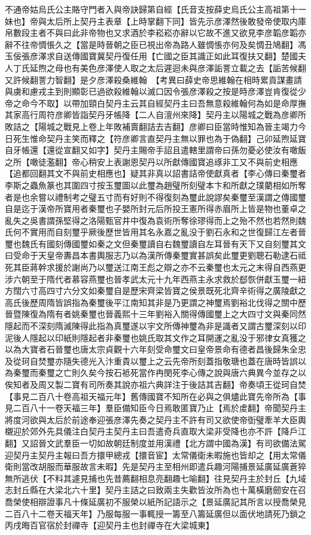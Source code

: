 不通帝姑烏氏公主賂守門者入與帝訣歸第自經【氏音支按薛史烏氏公主高祖第十一妹也】帝與太后所上契丹主表章【上時掌翻下同】皆先示彦澤然後敢發帝使取内庫帛數段主者不與曰此非帝物也又求酒於李崧崧亦辭以它故不進又欲見李彦韜彦韜亦辭不往帝惆悵久之【當是時晉朝之臣已視出帝為路人雖惆悵亦何及矣惆丑鳩翻】馮玉佞張彦澤求自送傳國寶冀契丹復任用【亡國之臣其識正如此耳復扶又翻】楚國夫人丁氏延煦之母也有美色彦澤使人取之太后遲迴未與彦澤詬詈立載之去【詬苦候翻又許候翻詈力智翻】是夕彦澤殺桑維翰　【考異曰薛史帝思維翰在相時累貢謀畫請與虜和慮戎主到則顯彰已過欲殺維翰以滅口因令張彦澤殺之按是時彦澤豈肯復從少帝之命今不取】以帶加頸白契丹主云其自經契丹主曰吾無意殺維翰何為如是命厚撫其家高行周符彦卿皆詣契丹牙帳降【二人自澶州來降】契丹主以陽城之戰為彦卿所敗詰之【陽城之戰見上卷上年敗補賣翻詰去吉翻】彦卿曰臣當時惟知為晉主竭力今日死生惟命契丹主笑而釋之【符彦卿言直契丹主無以罪也為于偽翻】己卯延煦延寶自牙帳還【還從宣翻又如字】契丹主賜帝手詔且遣轄里謂帝曰孫勿憂必使汝有噉飯之所【噉徒濫翻】帝心稍安上表謝恩契丹以所獻傳國寶追琢非工又不與前史相應【追都回翻其文不與前史相應也】疑其非真以詔書詰帝使獻真者【李心傳曰秦璽者李斯之蟲魚篆也其圍四寸按玉璽圖以此璽為趙璧所刻璧本卞和所獻之璞藺相如所奪者是也余嘗以禮制考之璧五寸而有好則不得復刻為璽此說謬矣秦璽至漢謂之傳國璽自是迄于漢帝所寶用者秦璽也子嬰所封元后所投王憲所得赤眉所上皆是物也董卓之亂失之吳書謂孫堅得之洛陽甄官井中復為袁術所奪徐璆得而上之殆不然也若然則魏氏何不實用而自刻璽乎厥後歷世皆用其名永嘉之亂没于劉石永和之世復歸江左者晉璽也魏氏有國刻傳國璽如秦之文但秦璽讀自右魏璽讀自左耳晉有天下又自刻璽其文曰受命于天皇帝夀昌本書輿服志乃以為漢所傳秦璽實甚誤矣此璽更劉聰石勒逮石祗死其臣蔣幹求援於謝尚乃以璽送江南王彪之辯之亦不云秦璽也太元之末得自西燕更涉六朝至于隋代者慕容燕璽也晉孝武太元十九年西燕主永求救於郄恢併獻玉璽一紐方闊六寸高四寸六分文如秦璽自是歷宋齊梁皆寶之侯景既死北齊辛術得之廣陵獻之高氏後歷周隋皆誤指為秦璽後平江南知其非是乃更謂之神璽焉劉裕北伐得之關中歷晉暨陳復為隋有者姚秦璽也晉義熙十三年劉裕入關得傳國璽上之大四寸文與秦同然隱起而不深刻隋滅陳得此指為真璽遂以宇文所傳神璽為非是識者又謂古璽深刻以印泥後人隱起以印紙則隱起者非秦璽也姚氏取其文作之耳開運之亂没于邪律女真獲之以為大寶者石晉璽也唐太宗貞觀十六年刻受命璽文曰皇帝景命有德者昌後歸朱全忠及從珂自焚璽亦隨失德光入汴重貴以璽上之云先帝所刻蓋指敬瑭也蓋在唐時皆誤以為秦璽而秦璽之亡則久矣今按石袛死當作冉閔死李心傳之說與唐六典異今並存之以俟知者及周又製二寶有司所奏其說亦祖六典詳注于後詰其吉翻】帝奏頃王從珂自焚【事見二百八十卷高祖天福元年】舊傳國寶不知所在必與之俱燼此寶先帝所為【事見二百八十一卷天福三年】羣臣備知臣今日焉敢匿寶乃止【焉於䖍翻】帝聞契丹主將度河欲與太后於前途奉迎張彦澤先奏之契丹主不許有司又欲使帝衘璧牽羊大臣輿櫬迎於郊外先具儀注白契丹主契丹主曰吾遣奇兵直取大梁非受降也亦不許【降戶江翻】又詔晉文武羣臣一切如故朝廷制度並用漢禮【北方謂中國為漢】有司欲備法駕迎契丹主契丹主報曰吾方擐甲總戎【擐音宦】太常儀衛未暇施也皆却之【用太常儀衛則當改胡服而華服故言未暇】先是契丹主至相州即遣兵趣河陽捕景延廣延廣蒼猝無所逃伏【不料其遽見捕也先昔薦翻相息亮翻趣七喻翻】往見契丹主於封丘【九域志封丘縣在大梁北六十里】契丹主詰之曰致兩主失歡皆汝所為也十萬橫磨劒安在召喬榮使相辯證事凡十條延廣初不服榮以紙所記語示之【景延廣記其所言以授喬榮見二百八十二卷天福天年】乃服每服一事輒授一籌至八籌延廣但以面伏地請死乃鎖之丙戌晦百官宿於封禪寺【迎契丹主也封禪寺在大梁城東】

